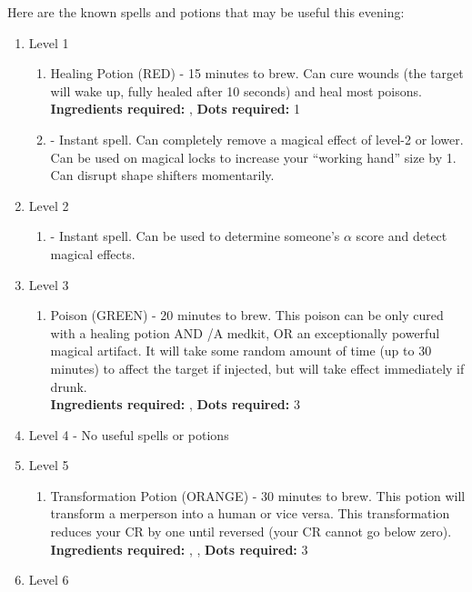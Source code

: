 \documentclass[green]{NeptuneBall}
\begin{document}
Here are the known spells and potions that may be useful this evening:
\begin{enumerate}
  \item Level 1
   \begin{enumerate}
     \item Healing Potion (RED) - 15 minutes to brew. Can cure wounds (the target will wake up, fully healed after 10 seconds) and heal most poisons.\\ 
     {\bf Ingredients required:} \iSeaSnake{}, \iSeaFan{}
		 {\bf Dots required:} 1
     \item \aLesserDispel{} - Instant spell. Can completely remove a magical effect of level-2 or lower. Can be used on magical locks to increase your ``working hand'' size by 1. Can disrupt shape shifters momentarily.
   \end{enumerate}
  \item Level 2
   \begin{enumerate}
     \item \aPerceive{} - Instant spell. Can be used to determine someone's $\alpha$ score and detect magical effects.
   \end{enumerate}
  \item Level 3
     \begin{enumerate}
     \item Poison (GREEN) - 20 minutes to brew. This poison can be only cured with a healing potion AND \aFirstAid{}/A medkit, OR an exceptionally powerful magical artifact. It will take some random amount of time (up to 30 minutes) to affect the target if injected, but will take effect immediately if drunk.\\
     {\bf Ingredients required:} \iSeaUrchins{}, \iAnglerFish{}
		 {\bf Dots required:} 3
   \end{enumerate}
   \item Level 4 - No useful spells or potions
   \item Level 5
    \begin{enumerate}
     \item Transformation Potion (ORANGE) - 30 minutes to brew. This potion will transform a merperson into a human or vice versa. This transformation reduces your CR by one until reversed (your CR cannot go below zero).\\
      {\bf Ingredients required:} \iSquid{}, \iSponge{}, \iBarnacle{}
			{\bf Dots required:} 3
   \end{enumerate}
   \item Level 6
    \begin{enumerate}

\end{enumerate}
\end{enumerate}
\end{document}
